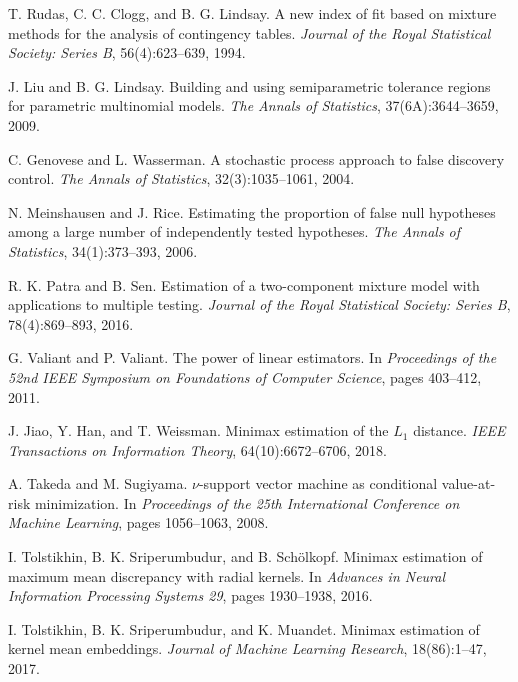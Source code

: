 T. Rudas, C. C. Clogg, and B. G. Lindsay.
\newblock A new index of fit based on mixture methods for the analysis of contingency tables.
\newblock \emph{Journal of the Royal Statistical Society: Series B}, 56(4):623--639, 1994.

J. Liu and B. G. Lindsay.
\newblock Building and using semiparametric tolerance regions for parametric multinomial models.
\newblock \emph{The Annals of Statistics}, 37(6A):3644--3659, 2009.

C. Genovese and L. Wasserman.
\newblock A stochastic process approach to false discovery control.
\newblock \emph{The Annals of Statistics}, 32(3):1035--1061, 2004.

N. Meinshausen and J. Rice.
\newblock Estimating the proportion of false null hypotheses among a large number of independently tested hypotheses.
\newblock \emph{The Annals of Statistics}, 34(1):373--393, 2006.

R. K. Patra and B. Sen.
\newblock Estimation of a two-component mixture model with applications to multiple testing.
\newblock \emph{Journal of the Royal Statistical Society: Series B}, 78(4):869--893, 2016.

G. Valiant and P. Valiant.
\newblock The power of linear estimators.
\newblock In \emph{Proceedings of the 52nd IEEE Symposium on Foundations of Computer Science}, pages 403--412, 2011.

J. Jiao, Y. Han, and T. Weissman.
\newblock Minimax estimation of the $L_1$ distance.
\newblock \emph{IEEE Transactions on Information Theory}, 64(10):6672--6706, 2018.

A. Takeda and M. Sugiyama.
\newblock $\nu$-support vector machine as conditional value-at-risk minimization.
\newblock In \emph{Proceedings of the 25th International Conference on Machine Learning}, pages 1056--1063, 2008.

I. Tolstikhin, B. K. Sriperumbudur, and B. Sch{\"o}lkopf.
\newblock Minimax estimation of maximum mean discrepancy with radial kernels.
\newblock In \emph{Advances in Neural Information Processing Systems 29}, pages 1930--1938, 2016.

I. Tolstikhin, B. K. Sriperumbudur, and K. Muandet.
\newblock Minimax estimation of kernel mean embeddings.
\newblock \emph{Journal of Machine Learning Research}, 18(86):1--47, 2017.

